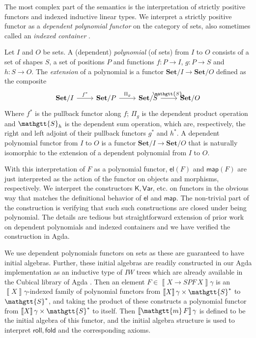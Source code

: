 \documentclass[acmsmall,nonacm]{acmart}
\renewcommand{\Sigma}{\mathgtt{S}}
\renewcommand{\mu}{\mathgtt{m}}
\newcommand{\SPF}{SPF}
\newcommand{\Var}{\mathsf{Var}}
\newcommand{\map}{\mathsf{map}}
\newcommand{\roll}{\mathsf{roll}}
\newcommand{\fold}{\mathsf{fold}}
\newcommand{\sem}[1]{\left\llbracket{#1}\right\rrbracket}
\newcommand{\Set}{\mathbf{Set}}
\newcommand{\el}{\mathsf{el}}
\begin{document}
The most complex part of the semantics is the interpretation of
strictly positive functors and indexed inductive linear types.  We
interpret a strictly positive functor as a \emph{dependent polynomial
functor} on the category of sets, also sometimes called an
\emph{indexed container} \cite{gambino_wellfounded_2004,altenkirch_indexed_2015}.
\begin{definition}
  Let $I$ and $O$ be sets. A (dependent) \emph{polynomial} (of sets)
  from $I$ to $O$ consists of a set of shapes $S$, a set of positions
  $P$ and functions $f : P \to I$, $g : P \to S$ and $h : S \to O$. The \emph{extension}
  of a polynomial is a functor $\Set/I \to \Set/O$ defined as the
  composite
  \[\begin{tikzcd}
	    {\Set/I} & {\Set/P} & {\Set/S} & {\Set/O}
	    \arrow["{f^*}", from=1-1, to=1-2]
	    \arrow["{\Pi_g}", from=1-2, to=1-3]
	    \arrow["{\Sigma_h}", from=1-3, to=1-4]
  \end{tikzcd}\]
  Where $f^*$ is the pullback functor along $f$; $\Pi_g$ is the dependent
  product operation and $\Sigma_h$ is the dependent sum operation, which
  are, respectively, the right and left adjoint of their pullback functors
  $g^*$ and $h^*$. A dependent polynomial functor from $I$ to $O$ is a functor $\Set/I
  \to \Set/O$ that is naturally isomorphic to the extension of a
  dependent polynomial from $I$ to $O$.
\end{definition}
With this interpretation of $F$ as a polynomial functor, $\el(F)$ and
$\map(F)$ are just interpreted as the action of the functor on objects
and morphisms, respectively. We interpret the constructors
$\mathsf{K},\Var$, etc. on functors in the obvious way that matches
the definitional behavior of $\el$ and $\map$. The non-trivial part of
the construction is verifying that such such constructions are closed
under being polynomial. The details are tedious but straightforward
extension of prior work on dependent polynomials and indexed
containers and we have verified the construction in Agda.

We use dependent polynomials functors on sets as these are guaranteed
to have initial algebras. Further, these initial algebras are readily
constructed in our Agda implementation as an inductive type of $IW$
trees which are already available in the Cubical library of Agda
\cite{The_Agda_Community_Cubical_Agda_Library_2024}.  Then an element $F \in \sem{X \to
  \SPF\,X}\gamma$ is an $\sem{X}\gamma$-indexed family of polynomial
functors from $\sem{X}\gamma\times \Sigma^*$ to $\Sigma^*$, and taking
the product of these constructs a polynomial functor from
$\sem{X}\gamma\times \Sigma^*$ to itself. Then $\sem{\mu\,F}\gamma$ is
defined to be the initial algebra of this functor, and the initial
algebra structure is used to interpret $\roll, \fold$ and the
corresponding axioms.
\end{document}

